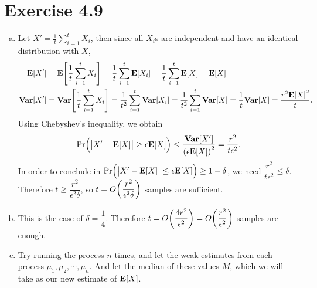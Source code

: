 \documentclass{article}
\begin{document}
\section*{Exercise 4.9}
\begin{enumerate}[(a)]
  \item Let $\displaystyle X' = \frac{1}{t}\sum_{i=1}^{t}X_i$, then since all $X_i$s are independent and have an identical distribution with $X$,
  \begin{align*}
    \mathbf{E}\qty[X'] &= \mathbf{E}\qty[\frac{1}{t}\sum_{i=1}^{t}X_i] = \frac{1}{t}\sum_{i=1}^{t}\mathbf{E}\qty[X_i] = \frac{1}{t}\sum_{i=1}^{t}\mathbf{E}\qty[X] = \mathbf{E}\qty[X] \\
    \mathbf{Var}\qty[X'] &= \mathbf{Var}\qty[\frac{1}{t}\sum_{i=1}^{t}X_i] = \frac{1}{t^2}\sum_{i=1}^{t}\mathbf{Var}\qty[X_i] = \frac{1}{t^2}\sum_{i=1}^{t}\mathbf{Var}\qty[X] = \frac{1}{t}\mathbf{Var}\qty[X] = \frac{r^2\mathbf{E}\qty[X]^2}{t}. \\
  \end{align*}
  Using Chebyshev's inequality, we obtain
  \begin{align*}
    \mathrm{Pr}\Big(\big|X' - \mathbf{E}\qty[X]\big| \geq \epsilon\mathbf{E}\qty[X]\Big) \leq \frac{\mathbf{Var}\qty[X']}{\qty(\epsilon\mathbf{E}\qty[X])^2} = \frac{r^2}{t\epsilon^2}.
  \end{align*}
  In order to conclude in $\displaystyle \mathrm{Pr}\Big(\big|X' - \mathbf{E}\qty[X]\big| \leq \epsilon\mathbf{E}\qty[X]\Big) \geq 1 - \delta$, we need $\dfrac{r^2}{t\epsilon^2} \leq \delta$. 
  Therefore $t \geq \dfrac{r^2}{\epsilon^2\delta}$, so $t = O\qty(\dfrac{r^2}{\epsilon^2\delta})$ samples are sufficient.
  \item This is the case of $\delta = \dfrac{1}{4}$. Therefore $t = O\qty(\dfrac{4r^2}{\epsilon^2}) = O\qty(\dfrac{r^2}{\epsilon^2})$ samples are enough.
  \item Try running the process $n$ times, and let the weak estimates from each process $\mu_1, \mu_2, \cdots, \mu_n$.
  And let the median of these values $M$, which we will take as our new estimate of $\mathbf{E}\qty[X]$.
  

\end{enumerate}
\end{document}
